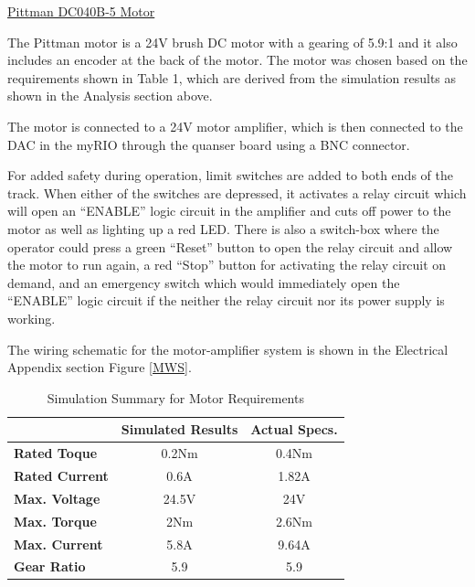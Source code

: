\vspace{.167in}
\noindent\underline{Pittman DC040B-5 Motor}\par
\vspace{.08in}
The Pittman motor is a 24V brush DC motor with a gearing of 5.9:1 and it also includes an encoder at the back of the motor. The motor was chosen based on the requirements shown in Table 1, which are derived from the simulation results as shown in the Analysis section above. \par
The motor is connected to a 24V motor amplifier, which is then connected to the DAC in the myRIO through the quanser board using a BNC connector.\par
For added safety during operation, limit switches are added to both ends of the track. When either of the switches are depressed, it activates a relay circuit which will open an ``ENABLE'' logic circuit in the amplifier and cuts off power to the motor as well as lighting up a red LED. There is also a switch-box where the operator could press a green ``Reset'' button to open the relay circuit and allow the motor to run again, a red ``Stop'' button for activating the relay circuit on demand, and an emergency switch which would immediately open the ``ENABLE'' logic circuit if the neither the relay circuit nor its power supply is working.\par
The wiring schematic for the motor-amplifier system is shown in the Electrical Appendix section Figure \ref{MWS}. \par

\begin{table}[]
\centering
\caption{Simulation Summary for Motor Requirements}
\label{Table 1}
\begin{tabular}{|l|c|c|}
\hline
                       & \textbf{Simulated Results} & \textbf{Actual Specs.} \\ \hline
\textbf{Rated Toque}   & 0.2Nm                      & 0.4Nm                  \\ \hline
\textbf{Rated Current} & 0.6A                       & 1.82A                  \\ \hline
\textbf{Max. Voltage}  & 24.5V                      & 24V                    \\ \hline
\textbf{Max. Torque}   & 2Nm                        & 2.6Nm                  \\ \hline
\textbf{Max. Current}  & 5.8A                       & 9.64A                  \\ \hline
\textbf{Gear Ratio}    & 5.9                        & 5.9                    \\ \hline
\end{tabular}
\end{table}

